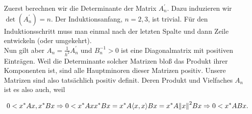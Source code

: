 Zuerst berechnen wir die Determinante der Matrix $A_n^\prime$. Dazu induzieren wir $\det(A_n^\prime) = n$. Der Induktionsanfang, $n = 2, 3$, ist trivial. Für den Induktionsschritt muss man einmal nach der letzten Spalte und dann Zeile entwickeln (oder umgekehrt). \\

Nun gilt aber $A_n = \frac{1}{h^2} A_n^\prime$ und $B_n^{-1} > 0$ ist eine Diagonalmatrix mit positiven Einträgen. Weil die Determinante solcher Matrizen bloß das Produkt ihrer Komponenten ist, sind alle Hauptminoren dieser Matrizen positiv. Unsere Matrizen sind also tatsächlich positiv definit. Deren Produkt und Vielfaches $A_n$ ist es also auch, weil

\begin{align*}
  0 < x^\ast A x, x^\ast B x
  \Rightarrow
  0 < x^\ast A x x^\ast B x =
  x^\ast A {\left < x, x \right >} B x =
  x^\ast A {\left \| x \right \|}_{}^2 B x
  \Rightarrow
  0 < x^\ast AB x.
\end{align*}
